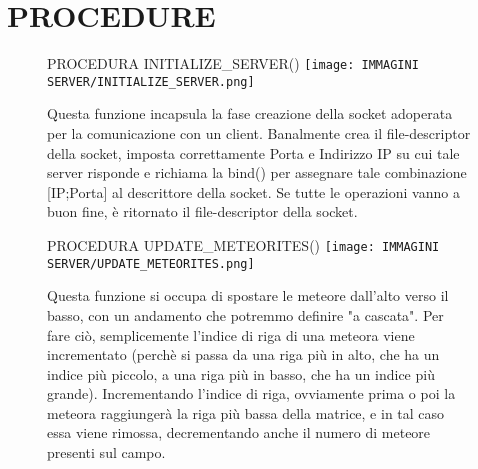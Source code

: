 \documentclass{article}
\begin{document}
\section{PROCEDURE}
\begin{enumerate}
    \begin{figure}[!htb]
     \item PROCEDURA INITIALIZE\_SERVER() \newline
        \centering
        \texttt{[image: IMMAGINI SERVER/INITIALIZE\_SERVER.png]}
        \raggedright\par
        Questa funzione incapsula la fase creazione della socket adoperata per la comunicazione con un client. Banalmente crea il file-descriptor della socket, imposta correttamente Porta e Indirizzo IP su cui tale server risponde e richiama la bind() per assegnare tale combinazione [IP;Porta] al descrittore della socket. \newline
        Se tutte le operazioni vanno a buon fine, è ritornato il file-descriptor della socket.
    \end{figure}
    
   \begin{figure}[!htb]
    \item PROCEDURA UPDATE\_METEORITES() \newline
       \centering
       \texttt{[image: IMMAGINI SERVER/UPDATE\_METEORITES.png]}
       \raggedright\par
        Questa funzione si occupa di spostare le meteore dall'alto verso il basso, con un andamento che potremmo definire "a cascata". Per fare ciò, semplicemente l'indice di riga di una meteora viene incrementato (perchè si passa da una riga più in alto, che ha un indice più piccolo, a una riga più in basso, che ha un indice più grande). \newline
       Incrementando l'indice di riga, ovviamente prima o poi la meteora raggiungerà la riga più bassa della matrice, e in tal caso essa viene rimossa, decrementando anche il numero di meteore presenti sul campo.
   \end{figure}


\end{enumerate}
\end{document}
